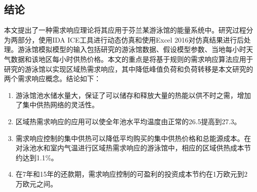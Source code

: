 \documentclass[hyperref]{ctexart}
\begin{document}
\begin{multicols}{2}
		\section{结论}
		本文提出了一种需求响应理论将其应用于芬兰某游泳馆的能量系统中。研究过程分为两部分，使用IDA ICE工具进行动态仿真和使用Excel 2016对仿真结果进行后处理。游泳馆模拟模型的输入包括研究的游泳馆数据、假设模型参数、当地每小时天气数据和该地区每小时供热价格。本文的重点是将基于规则的需求响应算法应用于研究的游泳馆以实现区域热需求响应，其中降低峰值负荷和负荷转移是本文研究的两个需求响应概念。结论如下：
		\par
		\begin{enumerate}	
			\item 游泳馆池水储水量大，保证了可以储存和释放大量的热能以供不时之需，增加了集中供热网络的灵活性。
			\item 区域热需求响应的应用可以使全年池水平均温度由正常的26.5\textcelsius 提高到27.3\textcelsius。
			\item 需求响应控制的集中供热可以降低平均购买的集中供热价格和总能源成本。在对泳池水和室内气温进行区域热需求响应的游泳馆中，相应的区域供热成本节约达到1.1\%。
			\item 在7年和15年的还款期，需求响应控制的可盈利的投资成本节约在1万欧元到2万欧元之间。
		\end{enumerate}

\end{multicols}
\end{document}
